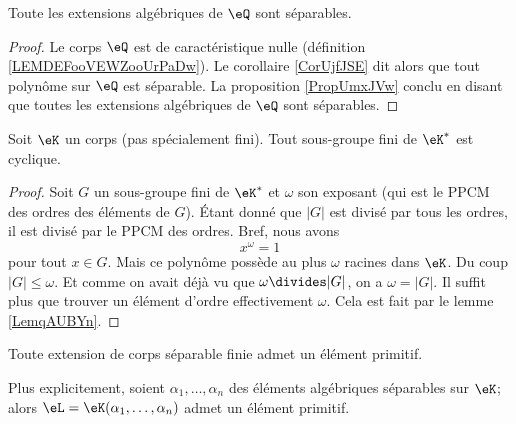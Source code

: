 \begin{corollary}  \label{CORooNZZMooIoBYXY}
    Toute les extensions algébriques de \( \eQ\) sont séparables.
\end{corollary}

\begin{proof}
    Le corps \( \eQ\) est de caractéristique nulle (définition \ref{LEMDEFooVEWZooUrPaDw}). Le corollaire \ref{CorUjfJSE} dit alors que tout polynôme sur \( \eQ\) est séparable. La proposition \ref{PropUmxJVw} conclu en disant que toutes les extensions algébriques de \( \eQ\) sont séparables.
\end{proof}

\begin{theorem}      \label{ThobkwCMm}
    Soit \( \eK\) un corps (pas spécialement fini). Tout sous-groupe fini de \( \eK^*\) est cyclique.
\end{theorem}

\begin{proof}
    Soit \( G\) un sous-groupe fini de \( \eK^*\) et \( \omega\) son exposant (qui est le PPCM des ordres des éléments de \( G\)). Étant donné que \( | G |\) est divisé par tous les ordres, il est divisé par le PPCM des ordres. Bref, nous avons
    \begin{equation}
        x^{\omega}=1
    \end{equation}
    pour tout \( x\in G\). Mais ce polynôme possède au plus \( \omega\) racines dans \( \eK\). Du coup \( | G |\leq \omega\). Et comme on avait déjà vu que \( \omega\divides | G |\), on a \( \omega=| G |\). Il suffit plus que trouver un élément d'ordre effectivement \( \omega\). Cela est fait par le lemme \ref{LemqAUBYn}.
\end{proof}

\begin{theorem}   \label{ThoORxgBC}
    Toute extension de corps séparable finie admet un élément primitif.

    Plus explicitement, soient \( \alpha_1,\ldots, \alpha_n\) des éléments algébriques séparables sur \( \eK\); alors \( \eL=\eK(\alpha_1,\ldots, \alpha_n)\) admet un élément primitif.
\end{theorem}

